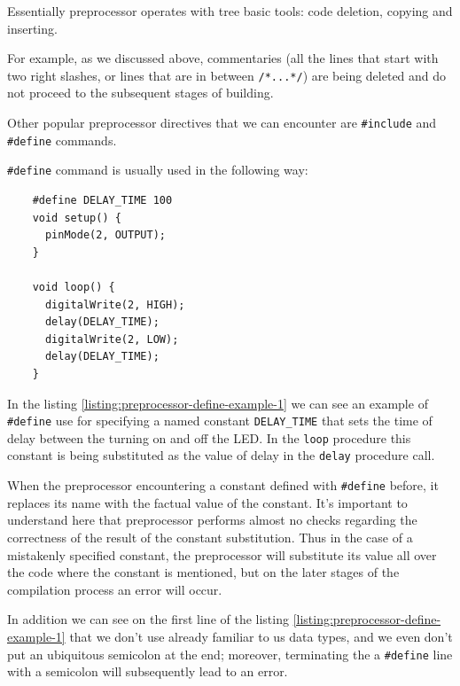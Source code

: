 \documentclass[../sparc.tex]{subfiles}
\begin{document}
Essentially preprocessor operates with tree basic tools: code deletion, copying
and inserting.

For example, as we discussed above, commentaries (all the lines that start with
two right slashes, or lines that are in between \texttt{/*...*/}) are
being deleted and do not proceed to the subsequent stages of building.

Other popular preprocessor directives that we can encounter are
\texttt{#include} and \texttt{#define} commands.

\texttt{#define} command is usually used in the following way:

\begin{listing}[H]
  \begin{verbatim}
    #define DELAY_TIME 100
    void setup() {
      pinMode(2, OUTPUT);
    }

    void loop() {
      digitalWrite(2, HIGH);
      delay(DELAY_TIME);
      digitalWrite(2, LOW);
      delay(DELAY_TIME);
    }
  \end{verbatim}
  \label{listing:preprocessor-define-example-1}
  \caption{An example of using a preprocessor directive for specifying a
    constant.}
\end{listing}

In the listing \ref{listing:preprocessor-define-example-1} we can see an example
of \texttt{#define} use for specifying a named constant
\texttt{DELAY_TIME} that sets the time of delay between the turning on
and off the LED.  In the \texttt{loop} procedure this constant is being
substituted as the value of delay in the \texttt{delay} procedure call.

When the preprocessor encountering a constant defined with
\texttt{#define} before, it replaces its name with the factual value of
the constant.  It's important to understand here that preprocessor performs
almost no checks regarding the correctness of the result of the constant
substitution.  Thus in the case of a mistakenly specified constant, the
preprocessor will substitute its value all over the code where the constant is
mentioned, but on the later stages of the compilation process an error will
occur.

In addition we can see on the first line of the listing
\ref{listing:preprocessor-define-example-1} that we don't use already familiar
to us data types, and we even don't put an ubiquitous semicolon at the end;
moreover, terminating the a \texttt{#define} line with a semicolon will
subsequently lead to an error.
\end{document}
